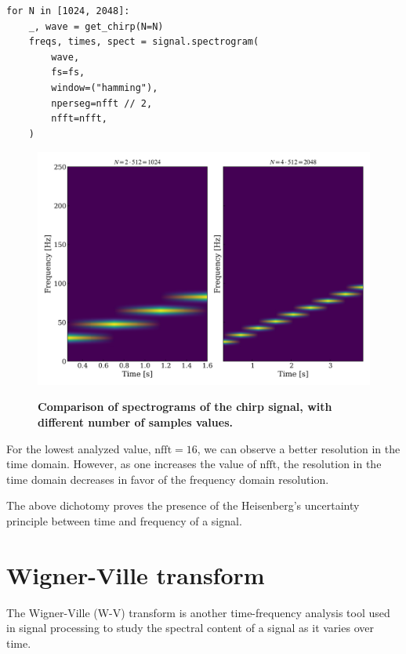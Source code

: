 \documentclass[13pt,a4paper]{article}
\begin{document}
\begin{lstlisting}[caption={\textbf{Snippet for generating spectrogram with different number of samples.}}]
for N in [1024, 2048]:
    _, wave = get_chirp(N=N)
    freqs, times, spect = signal.spectrogram(
        wave,
        fs=fs,
        window=("hamming"),
        nperseg=nfft // 2,
        nfft=nfft,
    )
\end{lstlisting}
\begin{figure}[ht!]
    \centering
    \caption{\textbf{Comparison of spectrograms of the chirp signal, with different number of samples values.}}
    \includegraphics[width=\linewidth]{spectrogram_size.png}
    \label{fig:spectrogram_size}
\end{figure}

For the lowest analyzed value, $\text{nfft}=16$, we can observe a better resolution in the time domain. However, as one increases the value of $\text{nfft}$, the resolution in the time domain decreases in favor of the frequency domain resolution.

The above dichotomy proves the presence of the Heisenberg's uncertainty principle between time and frequency of a signal.

\pagebreak

\section{Wigner-Ville transform}

The Wigner-Ville (W-V) transform is another time-frequency analysis tool used in signal processing to study the spectral content of a signal as it varies over time.
\end{document}

